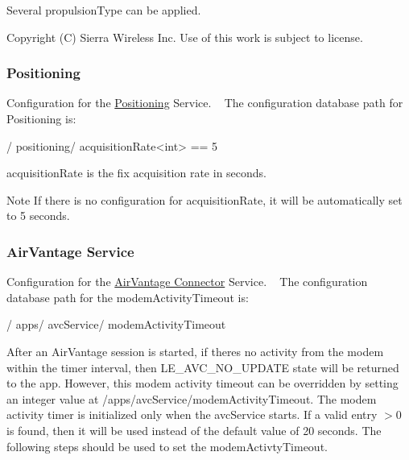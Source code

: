 Several \textquotesingle{}propulsion\+Type\textquotesingle{} can be applied.





Copyright (C) Sierra Wireless Inc. Use of this work is subject to license. ~\newline
\hypertarget{config_tree_page_posConfigTree}{}\subsubsection{Positioning}\label{config_tree_page_posConfigTree}
Configuration for the \hyperlink{c_pos}{Positioning} Service. ~\newline
 The configuration database path for Positioning is\+: \begin{DoxyVerb}/
    positioning/
        acquisitionRate<int> == 5
\end{DoxyVerb}



\begin{DoxyItemize}
\item \textquotesingle{}acquisition\+Rate\textquotesingle{} is the fix acquisition rate in seconds.
\end{DoxyItemize}

\begin{DoxyNote}{Note}
If there is no configuration for \textquotesingle{}acquisition\+Rate\textquotesingle{}, it will be automatically set to 5 seconds. ~\newline

\end{DoxyNote}
\hypertarget{config_tree_page_avcServiceConfigTree}{}\subsubsection{Air\+Vantage Service}\label{config_tree_page_avcServiceConfigTree}
Configuration for the \hyperlink{c_le_avc}{Air\+Vantage Connector} Service. ~\newline
 The configuration database path for the modem\+Activity\+Timeout is\+: \begin{DoxyVerb}/
    apps/
        avcService/
                 modemActivityTimeout
\end{DoxyVerb}


After an Air\+Vantage session is started, if there\textquotesingle{}s no activity from the modem within the timer interval, then L\+E\+\_\+\+A\+V\+C\+\_\+\+N\+O\+\_\+\+U\+P\+D\+A\+T\+E state will be returned to the app. However, this modem activity timeout can be overridden by setting an integer value at /apps/avc\+Service/modem\+Activity\+Timeout. The modem activity timer is initialized only when the avc\+Service starts. If a valid entry $>$0 is found, then it will be used instead of the default value of 20 seconds. The following steps should be used to set the modem\+Activty\+Timeout.

